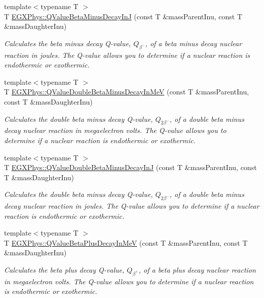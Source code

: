 \begin{DoxyCompactItemize}
{\footnotesize template$<$typename T $>$ }\\T \hyperlink{group___e_g_x_phys-_q_value_ga4a2ab24ffb317abc97ce46c92bb64c3c}{E\+G\+X\+Phys\+::\+Q\+Value\+Beta\+Minus\+Decay\+InJ} (const T \&mass\+Parent\+Inu, const T \&mass\+Daughter\+Inu)
\begin{DoxyCompactList}\small\item\em Calculates the beta minus decay Q-\/value, $Q_{\beta^-}$, of a beta minus decay nuclear reaction in joules. The Q-\/value allows you to determine if a nuclear reaction is endothermic or exothermic. \end{DoxyCompactList}\item 
{\footnotesize template$<$typename T $>$ }\\T \hyperlink{group___e_g_x_phys-_q_value_ga0eefdd84aa89d210e00dca043368dfeb}{E\+G\+X\+Phys\+::\+Q\+Value\+Double\+Beta\+Minus\+Decay\+In\+MeV} (const T \&mass\+Parent\+Inu, const T \&mass\+Daughter\+Inu)
\begin{DoxyCompactList}\small\item\em Calculates the double beta minus decay Q-\/value, $Q_{2\beta^-}$, of a double beta minus decay nuclear reaction in megaelectron volts. The Q-\/value allows you to determine if a nuclear reaction is endothermic or exothermic. \end{DoxyCompactList}\item 
{\footnotesize template$<$typename T $>$ }\\T \hyperlink{group___e_g_x_phys-_q_value_gaf19d189152aec04d8b1ebbbe8792540b}{E\+G\+X\+Phys\+::\+Q\+Value\+Double\+Beta\+Minus\+Decay\+InJ} (const T \&mass\+Parent\+Inu, const T \&mass\+Daughter\+Inu)
\begin{DoxyCompactList}\small\item\em Calculates the double beta minus decay Q-\/value, $Q_{2\beta^-}$, of a double beta minus decay nuclear reaction in joules. The Q-\/value allows you to determine if a nuclear reaction is endothermic or exothermic. \end{DoxyCompactList}\item 
{\footnotesize template$<$typename T $>$ }\\T \hyperlink{group___e_g_x_phys-_q_value_ga9bf549cd4f8e1c76e9cc41b72d4f0279}{E\+G\+X\+Phys\+::\+Q\+Value\+Beta\+Plus\+Decay\+In\+MeV} (const T \&mass\+Parent\+Inu, const T \&mass\+Daughter\+Inu)
\begin{DoxyCompactList}\small\item\em Calculates the beta plus decay Q-\/value, $Q_{\beta^+}$, of a beta plus decay nuclear reaction in megaelectron volts. The Q-\/value allows you to determine if a nuclear reaction is endothermic or exothermic. \end{DoxyCompactList}\item 

\end{DoxyCompactItemize}
